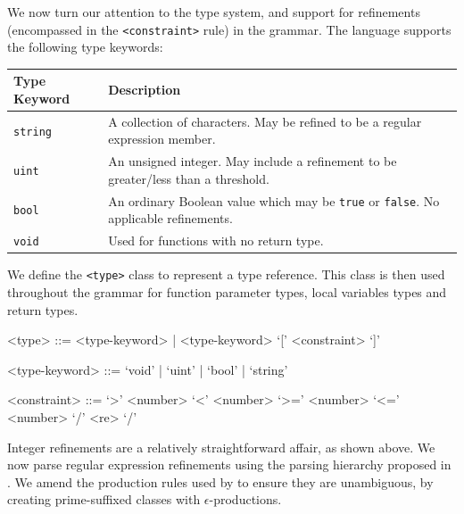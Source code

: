 \documentclass[a4paper,openany,12pt]{book}
\begin{document}
We now turn our attention to the type system, and support for refinements (encompassed in the \texttt{<constraint>} rule) in the grammar.
The language supports the following type keywords:

\def\arraystretch{1.5}
\begin{table}[H]

    \centering
    \begin{tabular}[t]{|p{3cm}|p{8cm}|}
        \hline
        \rowcolor{id7-aubergine}
        {\color[HTML]{FFFFFF} \sffamily \textbf{Type Keyword}} & {\color[HTML]{FFFFFF} \sffamily \textbf{Description}} \\ \hline
        \texttt{string} & A collection of characters. May be refined to be a regular expression member. \\ \hline
        \texttt{uint} & An unsigned integer. May include a refinement to be greater/less than a threshold. \\ \hline
        \texttt{bool} & An ordinary Boolean value which may be \texttt{true} or \texttt{false}. No applicable refinements. \\ \hline
        \texttt{void} & Used for functions with no return type. \\ \hline
    \end{tabular}
\end{table}

We define the \texttt{<type>} class to represent a type reference.
This class is then used throughout the grammar for function parameter types, local variables types and return
types.

\begin{grammar}
    <type> ::= <type-keyword> | <type-keyword> `[' <constraint> `]'

    <type-keyword> ::= `void' | `uint' | `bool' | `string'

    <constraint> ::= `>' <number> \alt `<' <number> \alt `>=' <number> \alt `<=' <number> \alt `/' <re> `/'
\end{grammar}

Integer refinements are a relatively straightforward affair, as shown above.
We now parse regular expression refinements using the parsing hierarchy proposed in \citet{cameron1999}.
We amend the production rules used by \citeauthor{cameron1999} to ensure they are unambiguous, by creating
prime-suffixed classes with $\epsilon$-productions.
\end{document}
